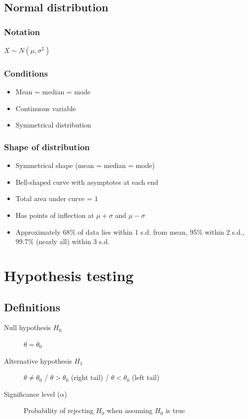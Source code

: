 \documentclass[A4paper, 11pt]{article}
\begin{document}
	\subsection{Normal distribution}
	\subsubsection{Notation}
	$X \sim N(\mu,\sigma^2)$
	\subsubsection{Conditions}
	\begin{itemize}
		\item Mean = median = mode
		\item Continuous variable
		\item Symmetrical distribution
	\end{itemize}
	\subsubsection{Shape of distribution}
	\begin{itemize}
		\item Symmetrical shape (mean = median = mode)
		\item Bell-shaped curve with asymptotes at each end
		\item Total area under curve = $1$
		\item Has points of inflection at $\mu+\sigma$ and $\mu-\sigma$
		\item Approximately 68\% of data lies within 1 s.d. from mean, 95\% within 2 s.d., 99.7\% (nearly all) within 3 s.d.
	\end{itemize}
	
	\pagebreak
	
	
	\section{Hypothesis testing}
	\subsection{Definitions}
	\begin{description}
		\item[Null hypothesis $H_0$] $\theta=\theta_0$
		\item[Alternative hypothesis $H_1$] $\theta \neq \theta_0$ / $\theta>\theta_0$ (right tail) / $\theta<\theta_0$ (left tail)
		\item[Significance level ($\alpha$)] Probability of rejecting $H_0$ when assuming $H_0$ is true
	\end{description}
	
\end{document}
